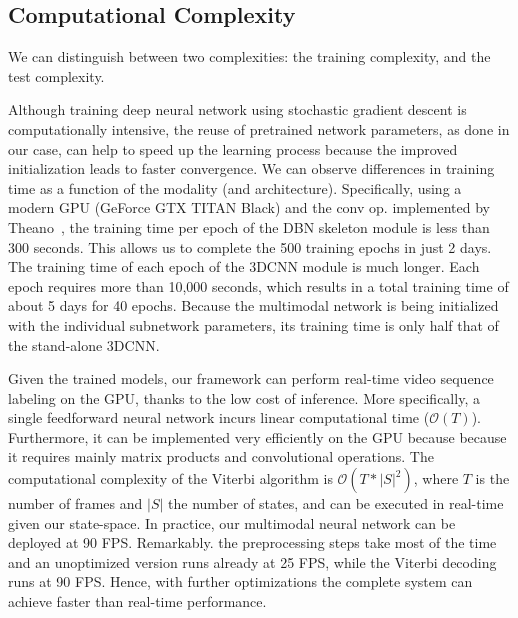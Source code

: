 \subsection{Computational Complexity}
\label{sec:ComputationalComplexity}

We can distinguish between two complexities: the training complexity, and the test complexity.

%
Although training deep neural network using stochastic gradient descent is computationally intensive,
the reuse of pretrained network parameters, as done in our case, can help to speed up the learning process because the improved initialization leads to faster convergence.
%
We can observe differences in training time as a function of the modality (and architecture).
%
Specifically, using a modern GPU (GeForce GTX TITAN Black) and the conv op. implemented by Theano~\cite{Bastien-Theano-2012},
the training time per epoch of the DBN skeleton module is less than 300 seconds. This allows us to complete the 500 training epochs in just 2 days.
%
The training time of each epoch of the 3DCNN \RGBD  module is much longer.
Each epoch requires more than 10,000 seconds, which results in a total training time of about 5 days for 40 epochs.
Because the multimodal network is being initialized with the individual subnetwork parameters, its training time is only half that of the stand-alone 3DCNN.


%
Given the trained models, our framework can perform real-time video sequence labeling on the GPU, thanks to the low cost of inference.
%
More specifically, a single feedforward neural network incurs linear computational time ($\mathcal{O}(T)$). Furthermore, it can be implemented very efficiently on the GPU because because it requires mainly matrix products and convolutional operations.
The computational complexity of the Viterbi algorithm is $\mathcal{O} (T* |S|^2)$, where
$T$ is the number of frames and $|S|$ the number of states, and can be executed in real-time given our state-space.
In practice, our multimodal neural network can be deployed at 90 FPS.
Remarkably. the preprocessing steps take most of the time and an unoptimized version runs already at 25 FPS, while the
 Viterbi decoding  runs at 90 FPS. Hence, with further optimizations the complete system can achieve faster than real-time performance.


\endinput
